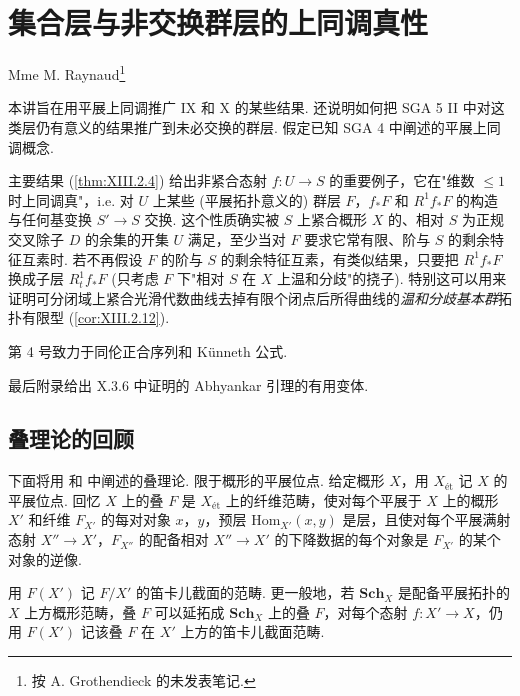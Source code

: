 \chapter{集合层与非交换群层的上同调真性}

\noindent Mme M. Raynaud\footnote{按 A. Grothendieck 的未发表笔记.}

本讲旨在用平展上同调推广 IX 和 X 的某些结果. 还说明如何把 SGA 5 II 中对这类层仍有意义的结果推广到未必交换的群层. 假定已知 SGA 4 中阐述的平展上同调概念.

主要结果 (\cref{thm:XIII.2.4}) 给出非紧合态射 $f \colon U \to S$ 的重要例子，它在"维数 $\leqslant 1$ 时上同调真"，i.e. 对 $U$ 上某些 (平展拓扑意义的) 群层 $F$，$f_* F$ 和 $R^1 f_* F$ 的构造与任何基变换 $S' \to S$ 交换. 这个性质确实被 $S$ 上紧合概形 $X$ 的、相对 $S$ 为正规交叉除子 $D$ 的余集的开集 $U$ 满足，至少当对 $F$ 要求它常有限、阶与 $S$ 的剩余特征互素时. 若不再假设 $F$ 的阶与 $S$ 的剩余特征互素，有类似结果，只要把 $R^1 f_* F$ 换成子层 $R^1_t f_* F$ (只考虑 $F$ 下"相对 $S$ 在 $X$ 上温和分歧"的挠子). 特别这可以用来证明可分闭域上紧合光滑代数曲线去掉有限个闭点后所得曲线的\emph{温和分歧基本群}拓扑有限型 (\cref{cor:XIII.2.12}).

第 4 号致力于同伦正合序列和 Künneth 公式.

最后附录给出 X.3.6 中证明的 Abhyankar 引理的有用变体.

\setcounter{section}{-1}

\section{叠理论的回顾}

下面将用 \cite{exp13-1} 和 \cite{exp13-2} 中阐述的叠理论. 限于概形的平展位点. 给定概形 $X$，用 $X_{\mathrm{ét}}$ 记 $X$ 的平展位点. 回忆 $X$ 上的叠 $F$ 是 $X_{\mathrm{ét}}$ 上的纤维范畴，使对每个平展于 $X$ 上的概形 $X'$ 和纤维 $F_{X'}$ 的每对对象 $x$，$y$，预层 $\mathrm{Hom}_{X'}(x, y)$ 是层，且使对每个平展满射态射 $X'' \to X'$，$F_{X''}$ 的配备相对 $X'' \to X'$ 的下降数据的每个对象是 $F_{X'}$ 的某个对象的逆像.

用 $F(X')$ 记 $F/X'$ 的笛卡儿截面的范畴. 更一般地，若 $\mathbf{Sch}_X$ 是配备平展拓扑的 $X$ 上方概形范畴，叠 $F$ 可以延拓成 $\mathbf{Sch}_X$ 上的叠 $F$，对每个态射 $f \colon X' \to X$，仍用 $F(X')$ 记该叠 $F$ 在 $X'$ 上方的笛卡儿截面范畴.

